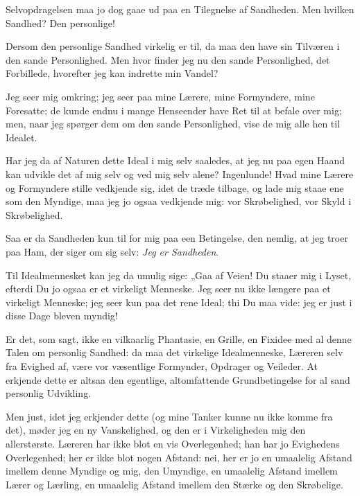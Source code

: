 \documentclass[12pt,a4paper]{book}
\newcommand{\apage}[1]{\marginnote{\footnotesize\textit{[#1]}}}
\begin{document}
Selvopdragelsen maa jo dog gaae ud paa en Tilegnelse af Sandheden. Men
hvilken Sandhed? Den personlige!

Dersom den personlige Sandhed virkelig er til, da maa den have sin Tilværen
i den sande Personlighed. Men hvor finder jeg nu den sande Personlighed, det
Forbillede, hvorefter jeg kan indrette min Vandel?

Jeg seer mig omkring; jeg seer paa mine Lærere, mine Formyndere, mine
Foresatte; de kunde endnu i mange Henseender have Ret til at befale over
mig; men, naar jeg spørger dem om den sande Personlighed, vise de mig alle
hen til Idealet.

Har jeg da af Naturen dette Ideal i mig selv saaledes, at jeg nu paa egen
Haand kan udvikle det af mig selv og ved mig selv alene? Ingenlunde! Hvad
mine Lærere og Formyndere stille vedkjende sig, idet de træde tilbage, og
lade mig staae ene som den Myndige, maa jeg jo ogsaa vedkjende mig: vor
Skrøbelighed, vor Skyld i Skrøbelighed.

Saa er da Sandheden kun til for mig paa een Betingelse, den nemlig, at jeg
troer paa Ham, der siger om sig selv: \emph{Jeg er Sandheden}.

Til Idealmennesket kan jeg da umulig sige: „Gaa af Veien! Du staaer mig i
Lyset, efterdi Du jo ogsaa er et virkeligt Menneske. Jeg seer nu ikke
længere paa et virkeligt Menneske; jeg seer kun paa det rene Ideal; thi Du
maa vide: jeg er just i disse Dage bleven myndig!
 \apage{107}

Er det, som sagt, ikke en vilkaarlig Phantasie, en Grille, en Fixidee med al
denne Talen om personlig Sandhed: da maa det virkelige Idealmenneske,
Læreren selv fra Evighed af, være vor væsentlige Formynder, Opdrager og
Veileder. At erkjende dette er altsaa den egentlige, altomfattende
Grundbetingelse for al sand personlig Udvikling.

Men just, idet jeg erkjender dette (og mine Tanker kunne nu ikke komme fra
det), møder jeg en ny Vanskelighed, og den er i Virkeligheden mig den
allerstørste. Læreren har ikke blot en vis Overlegenhed; han har jo
Evighedens Overlegenhed; her er ikke blot nogen Afstand: nei, her er jo en
umaalelig Afstand imellem denne Myndige og mig, den Umyndige, en umaalelig
Afstand imellem Lærer og Lærling, en umaalelig Afstand imellem den Stærke og
den Skrøbelige.
\end{document}
